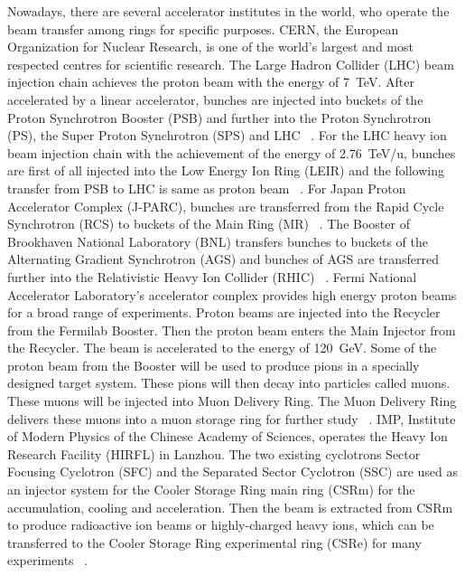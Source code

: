 %

Nowadays, there are several accelerator institutes in the world, who operate the beam transfer among rings for specific purposes. 
CERN, the European Organization for Nuclear Research, is one of the world's largest and most respected centres for scientific research. The Large Hadron Collider (LHC) beam injection chain achieves the proton beam with the energy of \SI{7}{TeV}. After accelerated by a linear accelerator, bunches are injected into buckets of the Proton Synchrotron Booster (PSB) and further into the Proton Synchrotron (PS), the Super Proton Synchrotron (SPS) and LHC ~\cite{ferrand_synchronization_2015}. For the LHC heavy ion beam injection chain with the achievement of the energy of \SI{2.76}{TeV/u}, bunches are first of all injected into the Low Energy Ion Ring (LEIR) and the following transfer from PSB to LHC is same as proton beam ~\cite{ferrand_synchronization_2015}. For Japan Proton Accelerator Complex (J-PARC), bunches are transferred from the Rapid Cycle Synchrotron (RCS) to buckets of the Main Ring (MR) ~\cite{_j-parc_????}. The Booster of Brookhaven National Laboratory (BNL) transfers bunches to buckets of the Alternating Gradient Synchrotron (AGS) and bunches of AGS are transferred further into the Relativistic Heavy Ion Collider (RHIC) ~\cite{_brookhaven_????}. Fermi National Accelerator Laboratory's accelerator complex provides high energy proton beams for a broad range of experiments. Proton beams are injected into the Recycler from the Fermilab Booster. Then the proton beam enters the Main Injector from the Recycler. The beam is accelerated to the energy of \SI{120}{GeV}. Some of the proton beam from the Booster will be used to produce pions in a specially designed target system. These pions will then decay into particles called muons. These muons will be injected into Muon Delivery Ring. The Muon Delivery Ring delivers these muons into a muon storage ring for further study ~\cite{_fermi_????}. IMP, Institute of Modern Physics of the Chinese Academy of Sciences, operates the Heavy Ion Research Facility (HIRFL) in Lanzhou. The two existing cyclotrons Sector Focusing Cyclotron (SFC) and the Separated Sector Cyclotron (SSC) are used as an injector system for the Cooler Storage Ring main ring (CSRm) for the accumulation, cooling and acceleration. Then the beam is extracted from CSRm to produce radioactive ion beams or highly-charged heavy ions, which can be transferred to the Cooler Storage Ring experimental ring (CSRe) for many experiments ~\cite{_institute_????, man_survey_2002}.  

